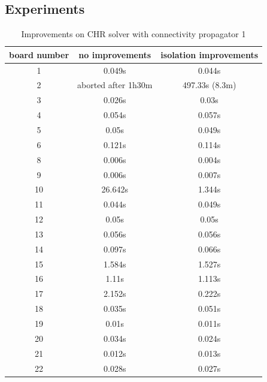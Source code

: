\documentclass{report}
\begin{document}
\subsection{Experiments}
\label{sub:hashi-exp-2}
\begin{table}[h]
\centering
\begin{tabular}{|c|c|c|}
\hline
    board number & no improvements & isolation improvements\\
    \hline
        1   & 0.049s & 0.044s \\
        2   & aborted after 1h30m & 497.33s (8.3m) \\
        3   & 0.026s & 0.03s \\
        4   & 0.054s & 0.057s \\
        5   & 0.05s & 0.049s \\
        6   & 0.121s & 0.114s \\
        8   & 0.006s & 0.004s \\
        9   & 0.006s & 0.007s \\
        10  & 26.642s & 1.344s \\
        11  & 0.044s & 0.049s \\
        12  & 0.05s & 0.05s \\
        13  & 0.056s & 0.056s \\
        14  & 0.097s & 0.066s \\
        15  & 1.584s & 1.527s \\
        16  & 1.11s & 1.113s \\
        17  & 2.152s & 0.222s \\
        18  & 0.035s & 0.051s \\
        19  & 0.01s & 0.011s \\
        20  & 0.034s & 0.024s \\
        21  & 0.012s & 0.013s \\
        22  & 0.028s & 0.027s \\
    \hline
\end{tabular}
\caption{Improvements on CHR solver with connectivity propagator 1}
\end{table}
\end{document}
